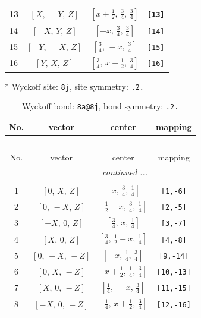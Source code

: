 \documentclass[fleqn,8pt]{jsarticle}
\begin{document}
\begin{longtable}{cccc}
13 & $\left[ X,\, - Y,\, Z \right]$ & $\left[ x + \frac{1}{2},\, \frac{3}{4},\, \frac{3}{4} \right]$ & {\tt [13]} \\ \hline
14 & $\left[ - X,\, Y,\, Z \right]$ & $\left[ - x,\, \frac{3}{4},\, \frac{3}{4} \right]$ & {\tt [14]} \\ \hline
15 & $\left[ - Y,\, - X,\, Z \right]$ & $\left[ \frac{3}{4},\, - x,\, \frac{3}{4} \right]$ & {\tt [15]} \\ \hline
16 & $\left[ Y,\, X,\, Z \right]$ & $\left[ \frac{3}{4},\, x + \frac{1}{2},\, \frac{3}{4} \right]$ & {\tt [16]} \\
\end{longtable}
* Wyckoff site: {\tt 8j}, site symmetry: {\tt .2.}
\renewcommand{\arraystretch}{1.2}
\begin{longtable}{cccc}
\caption{Wyckoff bond: {\tt 8a@8j}, bond symmetry: {\tt .2.}}
 \\
 \hline \hline
No. & vector & center & mapping \\ \hline \endfirsthead

\multicolumn{3}{l}{\tablename\ \thetable{}} \\
 \hline \hline
No. & vector & center & mapping \\ \hline \endhead

 \hline \hline
\multicolumn{3}{r}{\footnotesize\it continued ...} \\ \endfoot

 \hline \hline
\multicolumn{3}{r}{} \\ \endlastfoot

1 & $\left[ 0,\, X,\, Z \right]$ & $\left[ x,\, \frac{3}{4},\, \frac{1}{4} \right]$ & {\tt [1,-6]} \\ \hline
2 & $\left[ 0,\, - X,\, Z \right]$ & $\left[ \frac{1}{2} - x,\, \frac{3}{4},\, \frac{1}{4} \right]$ & {\tt [2,-5]} \\ \hline
3 & $\left[ - X,\, 0,\, Z \right]$ & $\left[ \frac{3}{4},\, x,\, \frac{1}{4} \right]$ & {\tt [3,-7]} \\ \hline
4 & $\left[ X,\, 0,\, Z \right]$ & $\left[ \frac{3}{4},\, \frac{1}{2} - x,\, \frac{1}{4} \right]$ & {\tt [4,-8]} \\ \hline
5 & $\left[ 0,\, - X,\, - Z \right]$ & $\left[ - x,\, \frac{1}{4},\, \frac{3}{4} \right]$ & {\tt [9,-14]} \\ \hline
6 & $\left[ 0,\, X,\, - Z \right]$ & $\left[ x + \frac{1}{2},\, \frac{1}{4},\, \frac{3}{4} \right]$ & {\tt [10,-13]} \\ \hline
7 & $\left[ X,\, 0,\, - Z \right]$ & $\left[ \frac{1}{4},\, - x,\, \frac{3}{4} \right]$ & {\tt [11,-15]} \\ \hline
8 & $\left[ - X,\, 0,\, - Z \right]$ & $\left[ \frac{1}{4},\, x + \frac{1}{2},\, \frac{3}{4} \right]$ & {\tt [12,-16]} \\
\end{longtable}
\end{document}
